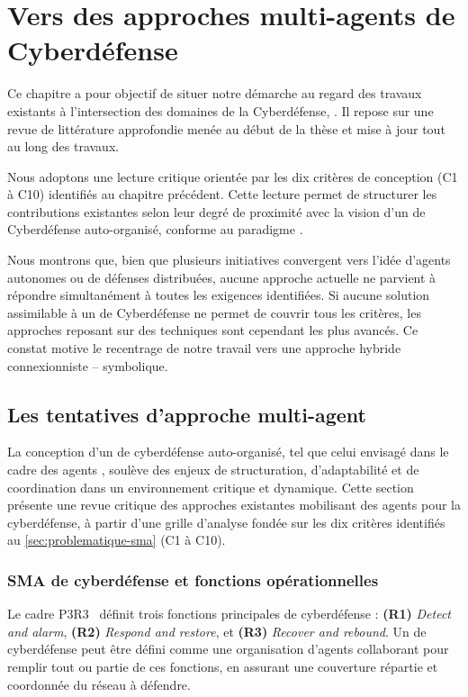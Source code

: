 \chapter{Vers des approches multi-agents de Cyberdéfense}

\noindent
Ce chapitre a pour objectif de situer notre démarche au regard des travaux existants à l'intersection des domaines de la Cyberdéfense, . Il repose sur une revue de littérature approfondie menée au début de la thèse et mise à jour tout au long des travaux.

Nous adoptons une lecture critique orientée par les dix critères de conception (C1 à C10) identifiés au chapitre précédent. Cette lecture permet de structurer les contributions existantes selon leur degré de proximité avec la vision d'un  de Cyberdéfense auto-organisé, conforme au paradigme .

Nous montrons que, bien que plusieurs initiatives convergent vers l'idée d'agents autonomes ou de défenses distribuées, aucune approche actuelle ne parvient à répondre simultanément à toutes les exigences identifiées.
Si aucune solution assimilable à un  de Cyberdéfense ne permet de couvrir tous les critères, les approches reposant sur des techniques  sont cependant les plus avancés.
Ce constat motive le recentrage de notre travail vers une approche hybride connexionniste --  symbolique.

\section{Les tentatives d'approche multi-agent}\label{sec:sma-conception}


La conception d'un  de cyberdéfense auto-organisé, tel que celui envisagé dans le cadre des agents , soulève des enjeux de structuration, d'adaptabilité et de coordination dans un environnement critique et dynamique. Cette section présente une revue critique des approches existantes mobilisant des agents pour la cyberdéfense, à partir d'une grille d'analyse fondée sur les dix critères identifiés au \autoref{sec:problematique-sma} (C1 à C10).

\subsection*{SMA de cyberdéfense et fonctions opérationnelles}

Le cadre P3R3~\cite{theron_p3r3_2021} définit trois fonctions principales de cyberdéfense : \textbf{(R1)} \textit{Detect and alarm}, \textbf{(R2)} \textit{Respond and restore}, et \textbf{(R3)} \textit{Recover and rebound}. Un  de cyberdéfense peut être défini comme une organisation d'agents collaborant pour remplir tout ou partie de ces fonctions, en assurant une couverture répartie et coordonnée du réseau à défendre.

